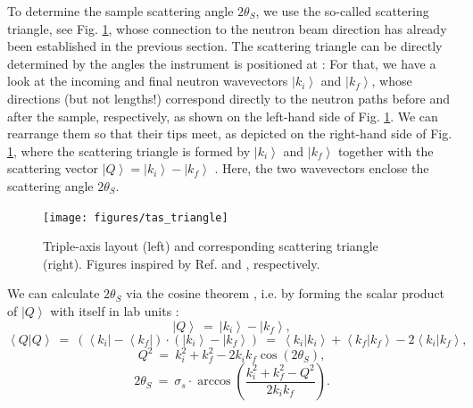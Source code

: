 
To determine the sample scattering angle $2 \theta_S$, we use the so-called scattering triangle, see 
Fig. \ref{fig:scattering_triangle}, whose connection to the neutron beam direction has already 
been established in the previous section.
The scattering triangle can be directly determined by the angles the instrument is positioned at \cite[pp. 14-15]{Shirane2002}: 
For that, we have a look at the incoming and final neutron wavevectors $\left| k_i \right>$ and $\left| k_f \right>$, 
whose directions (but not lengths!) correspond directly to the neutron paths before and after the sample, 
respectively, as shown on the left-hand side of Fig. \ref{fig:scattering_triangle}. We can rearrange them so 
that their tips meet, as depicted on the right-hand side of Fig. \ref{fig:scattering_triangle}, where the 
scattering triangle is formed by $\left| k_i \right>$ and $\left| k_f \right>$ together with the
scattering vector $\left| Q \right> = \left| k_i \right> - \left| k_f \right>$ \cite[p. 14]{Shirane2002}.
Here, the two wavevectors enclose the scattering angle $2 \theta_S$.

\begin{figure}
	\begin{center}
		\texttt{[image: figures/tas\_triangle]}
	\end{center}
	\caption[TAS layout and scattering triangle.]{
		Triple-axis layout (left) and corresponding scattering triangle (right).
		Figures inspired by Ref. \cite[p. 72, Fig. 3.8]{Shirane2002} and \cite[p. 15, Fig. 1.6]{Shirane2002}, respectively.
		\label{fig:scattering_triangle}}
\end{figure}

We can calculate $2 \theta_S$ via the cosine theorem \cite[pp. 694-695]{Arens2015}, i.e.
by forming the scalar product of $\left| Q \right>$ with itself in lab units \cite[p. 11]{Shirane2002}:
\begin{equation} 
	\left| Q \right> \ =\  \left| k_i \right> - \left| k_f \right>,
\end{equation}
\begin{equation} 
	\left< Q | Q \right> \ =\  \left( \left< k_i \right| - \left< k_f \right| \right) \cdot \left( \left| k_i \right> - \left| k_f \right> \right)
	\ =\  \left< k_i | k_i \right> + \left< k_f | k_f \right> - 2 \left< k_i | k_f \right>,
\end{equation}
\begin{equation} 
	Q^2 \ =\  k_i^2 + k_f^2 - 2 k_i k_f \cos \left( 2 \theta_S \right),
\end{equation}
\begin{equation}
	\boxed{ 2 \theta_S \ =\  \sigma_s \cdot \arccos \left( \frac{k_i^2 + k_f^2 - Q^2}{2 k_i k_f} \right). }
\end{equation}

